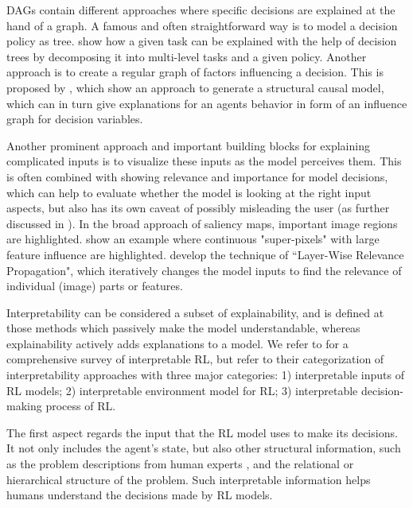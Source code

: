\documentclass[twoside,11pt]{article}
\begin{document}

DAGs contain different approaches where specific decisions are explained at the hand of a graph. A famous and often straightforward way is to model a decision policy as tree. \citet{ShuXiongSocher:2017:HierarchicalTaskExplanation} show how a given task can be explained with the help of decision trees by decomposing it into multi-level tasks and a given policy. Another approach is to create a regular graph of factors influencing a decision. This is proposed by \citet{MadumalEtAl:2020:CausalRLCFs}, which show an approach to generate a structural causal model, which can in turn give explanations for an agents behavior in form of an influence graph for decision variables.


Another prominent approach and important building blocks for explaining complicated inputs is to visualize these inputs as the model perceives them. This is often combined with showing relevance and importance for model decisions, which can help to evaluate whether the model is looking at the right input aspects, but also has its own caveat of possibly misleading the user (as further discussed in \citet{EvansEtAl:2021:ExplainabilityParadox}).
In the broad approach of saliency maps, important image regions are highlighted. \citet{LiuEtAl:2018:LinearModelUTrees} show an example where continuous "super-pixels" with large feature influence are highlighted. \citet{Bach:2015:LayerWiseRelevancePropagation} develop the technique of ``Layer-Wise Relevance Propagation", which iteratively changes the model inputs to find the relevance of individual (image) parts or features.

Interpretability can be considered a subset of explainability, and is defined at those methods which passively make the model understandable, whereas explainability actively adds explanations to a model. We refer to \cite{GlanoisEtAl:2021:SurveyInterpretableRL} for a comprehensive survey of interpretable RL, but refer to their categorization of interpretability approaches with three major categories: 1) interpretable inputs of RL models; 2) interpretable environment model for RL; 3) interpretable decision-making process of RL. %

The first aspect regards the input that the RL model uses to make its decisions. It not only includes the agent's state, but also other structural information, such as the problem descriptions from human experts \citep{hasanbeig2021deepsynth}, and the relational \citep{martinez2017relational,battaglia2018relational} or hierarchical structure \citep{andreas2017modular,lyu2019sdrl} of the problem. Such interpretable information helps humans understand the decisions made by RL models.\\
\end{document}
